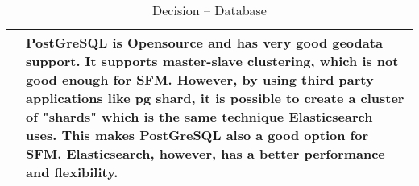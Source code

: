 \begin{table}[H]
\begin{tabular}{L{0.2\textwidth} L{0.6\textwidth}}
			& \textbf{PostGreSQL} is Opensource and has very good geodata support. It supports master-slave clustering, which is not good enough for SFM. However, by using third party applications like pg shard, it is possible to create a cluster of "shards" which is the same technique Elasticsearch uses. This makes PostGreSQL also a good option for SFM. Elasticsearch, however, has a better performance and flexibility.
	\\ \bottomrule
	\end{tabular}
	\caption{Decision -- Database}
	\label{table:linux}
\end{table}

